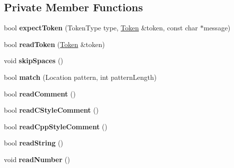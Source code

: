 \subsection*{Private Member Functions}
\begin{DoxyCompactItemize}
\item 
\hypertarget{class_json_1_1_reader_a442d779d60825634625040eed83eadc5}{bool {\bfseries expect\-Token} (Token\-Type type, \hyperlink{class_json_1_1_reader_1_1_token}{Token} \&token, const char $\ast$message)}\label{class_json_1_1_reader_a442d779d60825634625040eed83eadc5}

\item 
\hypertarget{class_json_1_1_reader_a7cb0631963cc0fd4ff6ed0f570976864}{bool {\bfseries read\-Token} (\hyperlink{class_json_1_1_reader_1_1_token}{Token} \&token)}\label{class_json_1_1_reader_a7cb0631963cc0fd4ff6ed0f570976864}

\item 
\hypertarget{class_json_1_1_reader_a40d0f69d15aeb2d52ff78d794f5ab8b2}{void {\bfseries skip\-Spaces} ()}\label{class_json_1_1_reader_a40d0f69d15aeb2d52ff78d794f5ab8b2}

\item 
\hypertarget{class_json_1_1_reader_a3e5a7bc6b7b53f2ca8cb9da42f8ffb21}{bool {\bfseries match} (Location pattern, int pattern\-Length)}\label{class_json_1_1_reader_a3e5a7bc6b7b53f2ca8cb9da42f8ffb21}

\item 
\hypertarget{class_json_1_1_reader_ad2690e860a1b3332c5401fb0850ba065}{bool {\bfseries read\-Comment} ()}\label{class_json_1_1_reader_ad2690e860a1b3332c5401fb0850ba065}

\item 
\hypertarget{class_json_1_1_reader_ae0ffe796abdc3c5851589ee500e28c79}{bool {\bfseries read\-C\-Style\-Comment} ()}\label{class_json_1_1_reader_ae0ffe796abdc3c5851589ee500e28c79}

\item 
\hypertarget{class_json_1_1_reader_a6716ef6290b0f469efaf8d379c357967}{bool {\bfseries read\-Cpp\-Style\-Comment} ()}\label{class_json_1_1_reader_a6716ef6290b0f469efaf8d379c357967}

\item 
\hypertarget{class_json_1_1_reader_a6328a0b1994e05118886f9fc9c608643}{bool {\bfseries read\-String} ()}\label{class_json_1_1_reader_a6328a0b1994e05118886f9fc9c608643}

\item 
\hypertarget{class_json_1_1_reader_afb31bfda6bb27d6453057a47655e8363}{void {\bfseries read\-Number} ()}\label{class_json_1_1_reader_afb31bfda6bb27d6453057a47655e8363}


\end{DoxyCompactItemize}
